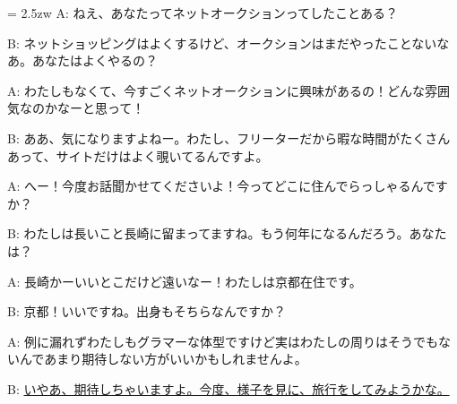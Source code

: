 \documentclass[11pt]{amsart}
\title{}
\author{}
\newenvironment{hangall}[1]{\hangindent = 2.5zw\everypar{\hangindent = 2.5zw}}{}
\begin{document}
\maketitle
\begin{hangall}{}%
A: ねえ、あなたってネットオークションってしたことある？

B: ネットショッピングはよくするけど、オークションはまだやったことないなあ。あなたはよくやるの？

A: わたしもなくて、今すごくネットオークションに興味があるの！どんな雰囲気なのかなーと思って！

B: ああ、気になりますよねー。わたし、フリーターだから暇な時間がたくさんあって、サイトだけはよく覗いてるんですよ。

A: へー！今度お話聞かせてくださいよ！今ってどこに住んでらっしゃるんですか？

B: わたしは長いこと長崎に留まってますね。もう何年になるんだろう。あなたは？

A: 長崎かーいいとこだけど遠いなー！わたしは京都在住です。

B: 京都！いいですね。出身もそちらなんですか？

A: 例に漏れずわたしもグラマーな体型ですけど実はわたしの周りはそうでもないんであまり期待しない方がいいかもしれませんよ。

B: \ul{いやあ、期待しちゃいますよ。今度、様子を見に、旅行をしてみようかな。}\end{hangall}
\end{document}
